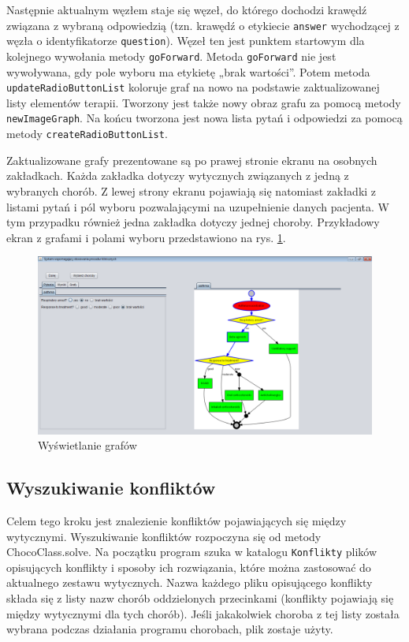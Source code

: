 Następnie aktualnym węzłem staje się węzeł, do którego dochodzi krawędź związana z wybraną odpowiedzią (tzn. krawędź o etykiecie \texttt{answer} wychodzącej z węzła o identyfikatorze \texttt{question}). Węzeł ten jest punktem startowym dla kolejnego wywołania metody \texttt{goForward}. Metoda \texttt{goForward} nie jest wywoływana, gdy pole wyboru ma etykietę „brak wartości”. Potem metoda \texttt{updateRadio\-ButtonList} koloruje graf na nowo na podstawie zaktualizowanej listy elementów terapii. Tworzony jest także nowy obraz grafu za pomocą metody \texttt{newImageGraph}. Na końcu tworzona jest nowa lista pytań i odpowiedzi za pomocą metody \texttt{createRadioButtonList}. 

Zaktualizowane grafy prezentowane są po prawej stronie ekranu na osobnych zakładkach. Każda zakładka dotyczy wytycznych związanych z jedną z wybranych chorób. Z lewej strony ekranu pojawiają się natomiast zakładki z listami pytań i pól wyboru pozwalającymi na uzupełnienie danych pacjenta. W tym przypadku również jedna zakładka dotyczy jednej choroby. Przykładowy ekran z grafami i polami wyboru przedstawiono na rys. \ref{fig:wyswietlanie_grafow}.
\begin{figure}[H]
\centering
\includegraphics[width=\textwidth]{img/wyswietlanie_grafow.png}
\caption{Wyświetlanie grafów}
\label{fig:wyswietlanie_grafow}
\end{figure}

\subsection{Wyszukiwanie konfliktów}
Celem tego kroku jest znalezienie konfliktów pojawiających się między wytycznymi. Wyszukiwanie konfliktów rozpoczyna się od metody ChocoClass.solve. Na początku program szuka w katalogu \texttt{Konflikty} plików opisujących konflikty i sposoby ich rozwiązania, które można zastosować do aktualnego zestawu wytycznych. Nazwa każdego pliku opisującego konflikty składa się z listy nazw chorób oddzielonych przecinkami (konflikty pojawiają się między wytycznymi dla tych chorób). Jeśli jakakolwiek choroba z tej listy została wybrana podczas działania programu chorobach, plik zostaje użyty. 

